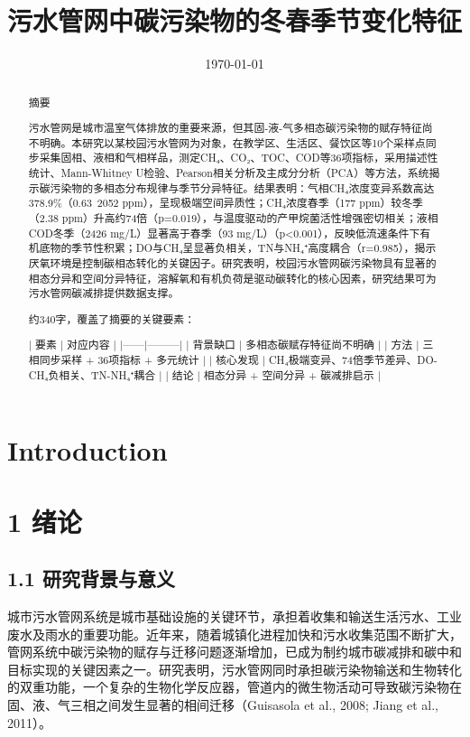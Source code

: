 \documentclass[12pt]{article}
\title{污水管网中碳污染物的冬春季节变化特征}
\date{\today}
\begin{document}
\maketitle

\begin{abstract}
摘要

污水管网是城市温室气体排放的重要来源，但其固-液-气多相态碳污染物的赋存特征尚不明确。本研究以某校园污水管网为对象，在教学区、生活区、餐饮区等10个采样点同步采集固相、液相和气相样品，测定CH₄、CO₂、TOC、COD等36项指标，采用描述性统计、Mann-Whitney U检验、Pearson相关分析及主成分分析（PCA）等方法，系统揭示碳污染物的多相态分布规律与季节分异特征。结果表明：气相CH₄浓度变异系数高达378.9\%（0.63~2052 ppm），呈现极端空间异质性；CH₄浓度春季（177 ppm）较冬季（2.38 ppm）升高约74倍（p=0.019），与温度驱动的产甲烷菌活性增强密切相关；液相COD冬季（2426 mg/L）显著高于春季（93 mg/L）（p<0.001），反映低流速条件下有机底物的季节性积累；DO与CH₄呈显著负相关，TN与NH₄⁺高度耦合（r=0.985），揭示厌氧环境是控制碳相态转化的关键因子。研究表明，校园污水管网碳污染物具有显著的相态分异和空间分异特征，溶解氧和有机负荷是驱动碳转化的核心因素，研究结果可为污水管网碳减排提供数据支撑。

约340字，覆盖了摘要的关键要素：

| 要素 | 对应内容 |
|------|---------|
| 背景缺口 | 多相态碳赋存特征尚不明确 |
| 方法 | 三相同步采样 + 36项指标 + 多元统计 |
| 核心发现 | CH₄极端变异、74倍季节差异、DO-CH₄负相关、TN-NH₄⁺耦合 |
| 结论 | 相态分异 + 空间分异 + 碳减排启示 |
\end{abstract}

\section{Introduction}
\label{sec:introduction}

\section{1 绪论}

\subsection{1.1 研究背景与意义}

城市污水管网系统是城市基础设施的关键环节，承担着收集和输送生活污水、工业废水及雨水的重要功能。近年来，随着城镇化进程加快和污水收集范围不断扩大，管网系统中碳污染物的赋存与迁移问题逐渐增加，已成为制约城市碳减排和碳中和目标实现的关键因素之一。研究表明，污水管网同时承担碳污染物输送和生物转化的双重功能，一个复杂的生物化学反应器，管道内的微生物活动可导致碳污染物在固、液、气三相之间发生显著的相间迁移（Guisasola et al., 2008; Jiang et al., 2011）。
\end{document}
